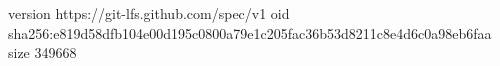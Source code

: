version https://git-lfs.github.com/spec/v1
oid sha256:e819d58dfb104e00d195c0800a79e1c205fac36b53d8211c8e4d6c0a98eb6faa
size 349668
